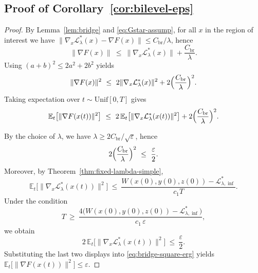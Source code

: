 \documentclass{article}
\newcommand{\1}{\mathbf{1}}
\begin{document}
\subsection{Proof of Corollary~\ref{cor:bilevel-eps}}\label{cor:bilevel-epsss}
\begin{proof}
By Lemma~\ref{lem:bridge} and \eqref{eq:Gstar-assump}, for all $x$ in the region of interest we have
$\|\nabla_x \mathcal L_\lambda^{*}(x)-\nabla F(x)\|\le C_{\mathrm{br}}/\lambda$, hence
\[
\|\nabla F(x)\|\ \le\ \|\nabla_x \mathcal L_\lambda^{*}(x)\|+\frac{C_{\mathrm{br}}}{\lambda}.
\]
Using $(a+b)^2\le 2a^2+2b^2$ yields
\begin{equation}\label{eq:bridge-square}
\|\nabla F(x)\|^2
\ \le\
2\|\nabla_x \mathcal L_\lambda^{*}(x)\|^2
+2\Bigl(\frac{C_{\mathrm{br}}}{\lambda}\Bigr)^2.
\end{equation}
Taking expectation over $t\sim\mathrm{Unif}[0,T]$ gives
\begin{equation}\label{eq:bridge-square-erg}
\mathbb E_t\bigl[\|\nabla F(x(t))\|^2\bigr]
\ \le\
2\,\mathbb E_t\bigl[\|\nabla_x \mathcal L_\lambda^{*}(x(t))\|^2\bigr]
+2\Bigl(\frac{C_{\mathrm{br}}}{\lambda}\Bigr)^2.
\end{equation}

By the choice of $\lambda$, we have $\lambda\ge 2C_{\mathrm{br}}/\sqrt{\varepsilon}$, hence
\[
2\Bigl(\frac{C_{\mathrm{br}}}{\lambda}\Bigr)^2\ \le\ \frac{\varepsilon}{2}.
\]
Moreover, by Theorem~\ref{thm:fixed-lambda-simple},
\[
\mathbb E_t\bigl[\|\nabla_x \mathcal L_\lambda^{*}(x(t))\|^2\bigr]
\ \le\ \frac{W(x(0),y(0),z(0))-\mathcal L_{\lambda,\inf}^{*}}{c_1T}.
\]
Under the condition
\[
T\ \ge\ \frac{4\bigl(W(x(0),y(0),z(0))-\mathcal L_{\lambda,\inf}^{*}\bigr)}{c_1\,\varepsilon},
\]
we obtain
\[
2\,\mathbb E_t\bigl[\|\nabla_x \mathcal L_\lambda^{*}(x(t))\|^2\bigr]\ \le\ \frac{\varepsilon}{2}.
\]
Substituting the last two displays into \eqref{eq:bridge-square-erg} yields
$\mathbb E_t\bigl[\|\nabla F(x(t))\|^2\bigr]\le \varepsilon$.
\end{proof}



\end{document}
